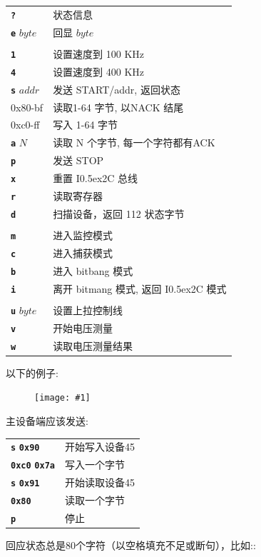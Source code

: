 \documentclass{article}
\newcommand{\two}{\raise0.5ex\hbox{\footnotesize{2}}}
\newcommand{\iic}{I\two{}C}
\newcommand{\png}[1]{
\begin{figure}[H]
\begin{center}
\texttt{[image: \#1]}
\end{center}
\end{figure}
}
\newcommand{\mach}[1]{\texttt{\textbf{#1}}}
\newcommand{\gap}{\vspace{10pt}}
\begin{document}
\gap\begin{tabular}{ll}
\hline
  \mach{?}        & 状态信息 \\
  \mach{e} $byte$ & 回显 $byte$\\
\\
  \mach{1}        & 设置速度到 100 KHz\\
  \mach{4}        & 设置速度到 400 KHz\\
  \mach{s} $addr$ & 发送 START/addr, 返回状态\\
  0x80-bf         & 读取1-64 字节, 以NACK 结尾\\
  0xc0-ff         & 写入 1-64 字节\\
  \mach{a} $N$    &读取 N 个字节, 每一个字符都有ACK \\
  \mach{p}        & 发送 STOP\\
  \mach{x}        & 重置 \iic{} 总线\\
  \mach{r}        & 读取寄存器\\
  \mach{d}        & 扫描设备，返回 112 状态字节\\
\\
  \mach{m}        & 进入监控模式\\
  \mach{c}        & 进入捕获模式\\
  \mach{b}        & 进入 bitbang 模式\\
  \mach{i}        & 离开 bitmang 模式, 返回 \iic{} 模式\\
\\
  \mach{u} $byte$ & 设置上拉控制线\\
  \mach{v}        & 开始电压测量\\
  \mach{w}        & 读取电压测量结果\\
\hline
\end{tabular}\gap

以下的例子:

\png{img/i2cdriver/hero3}

主设备端应该发送:

\gap\begin{tabular}{ll}
\mach{s} \mach{0x90}    &   开始写入设备45\\
\mach{0xc0} \mach{0x7a} & 写入一个字节\\
\mach{s} \mach{0x91}    &  开始读取设备45\\
\mach{0x80}          &  读取一个字节\\
\mach{p}             & 停止\\
\end{tabular}\gap

回应状态总是80个字符（以空格填充不足或断句），比如::
\end{document}
